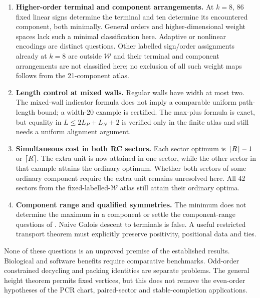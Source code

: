 \begin{enumerate}
\item \textbf{Higher-order terminal and component arrangements.}
At $k=8$, 86 fixed linear signs determine the terminal and ten
determine its encountered component, both minimally. General
orders and higher-dimensional weight spaces lack such a minimal
classification here. Adaptive or nonlinear encodings are distinct
questions. Other labelled sign/order assignments already at $k=8$ are outside $\mathcal W$ and their terminal and component arrangements are not classified here; no exclusion of all such weight maps follows from the 21-component atlas.

\item \textbf{Length control at mixed walls.}
Regular walls have width at most two. The mixed-wall indicator
formula does not imply a comparable uniform path-length bound;
a width-20 example is certified. The max-plus formula is exact,
but equality in $L\le2L_P+L_N+2$ is verified only in the finite
atlas and still needs a uniform alignment argument.

\item \textbf{Simultaneous cost in both RC sectors.}
Each sector optimum is $\left\lceil R\right\rceil-1$ or $\left\lceil R\right\rceil$.
The extra unit is now attained in one sector, while the other
sector in that example attains the ordinary optimum. Whether
both sectors of some ordinary component require the extra unit
remains unresolved here. All 42 sectors from the fixed-labelled-$\mathcal W$ atlas
still attain their ordinary optima.

\item \textbf{Component range and qualified symmetries.}
The minimum does not determine the maximum in a component or
settle the component-range questions of
\cite{MarcaisDeBlasioKingsford2024}. Naive Galois descent to
terminals is false. A useful restricted transport theorem must
explicitly preserve positivity, positional data and ties.
\end{enumerate}

None of these questions is an unproved premise of the established
results. Biological and software benefits require comparative
benchmarks. Odd-order constrained decycling and packing identities
are separate problems. The general height theorem permits fixed
vertices, but this does not remove the even-order hypotheses of
the PCR chart, paired-sector and stable-completion applications.

